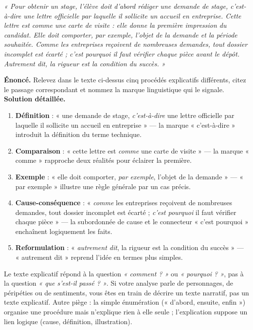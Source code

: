 \documentclass[11pt]{article}
\begin{document}
\emph{« Pour obtenir un stage, l'élève doit d'abord rédiger une demande de stage, c'est-à-dire une lettre officielle par laquelle il sollicite un accueil en entreprise. Cette lettre est comme une carte de visite : elle donne la première impression du candidat. Elle doit comporter, par exemple, l'objet de la demande et la période souhaitée. Comme les entreprises reçoivent de nombreuses demandes, tout dossier incomplet est écarté ; c'est pourquoi il faut vérifier chaque pièce avant le dépôt. Autrement dit, la rigueur est la condition du succès. »}

\begin{exoresolu}
\textbf{Énoncé.} Relevez dans le texte ci-dessus cinq procédés explicatifs différents, citez le passage correspondant et nommez la marque linguistique qui le signale.
\tcblower
\textbf{Solution détaillée.}
\begin{enumerate}
\item \textbf{Définition} : « une demande de stage, \emph{c'est-à-dire} une lettre officielle par laquelle il sollicite un accueil en entreprise » — la marque « c'est-à-dire » introduit la définition du terme technique.
\item \textbf{Comparaison} : « cette lettre est \emph{comme} une carte de visite » — la marque « comme » rapproche deux réalités pour éclairer la première.
\item \textbf{Exemple} : « elle doit comporter, \emph{par exemple}, l'objet de la demande » — « par exemple » illustre une règle générale par un cas précis.
\item \textbf{Cause-conséquence} : « \emph{comme} les entreprises reçoivent de nombreuses demandes, tout dossier incomplet est écarté ; \emph{c'est pourquoi} il faut vérifier chaque pièce » — la subordonnée de cause et le connecteur « c'est pourquoi » enchaînent logiquement les faits.
\item \textbf{Reformulation} : « \emph{autrement dit}, la rigueur est la condition du succès » — « autrement dit » reprend l'idée en termes plus simples.
\end{enumerate}
\end{exoresolu}

\begin{attention}
Le texte explicatif répond à la question \emph{« comment ? »} ou \emph{« pourquoi ? »}, pas à la question \emph{« que s'est-il passé ? »}. Si votre analyse parle de personnages, de péripéties ou de sentiments, vous êtes en train de décrire un texte narratif, pas un texte explicatif. Autre piège : la simple énumération (« d'abord, ensuite, enfin ») organise une procédure mais n'explique rien à elle seule ; l'explication suppose un lien logique (cause, définition, illustration).
\end{attention}
\end{document}
